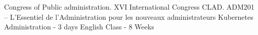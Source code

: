 
\begin{scholarship}
			{Congress of Public administration. XVI International Congress CLAD.}
			{ADM201 – L’Essentiel de l’Administration pour les nouveaux administrateurs}
			{Kubernetes Administration - 3 days}
			{English Class - 8 Weeks}
\end{scholarship}
